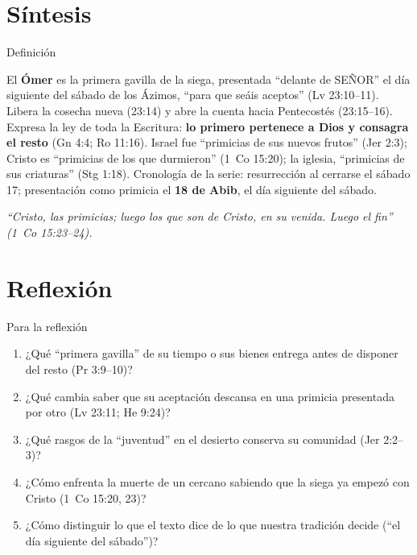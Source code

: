 \documentclass[hyperref={bookmarks=false},aspectratio=169]{beamer}
\newcommand{\SENOR}{S{\fontsize{0.78em}{1em}\selectfont EÑOR}}
\newcommand{\destacar}[1]{\textbf{\textcolor{tierraroja}{#1}}}
\begin{document}
\section{Síntesis}

\begin{frame}{Definición}
\begin{tcolorbox}[colback=papiro,colframe=tierraroja,boxrule=1pt,arc=3pt,fontupper=\small]
\RaggedRight El \destacar{Ómer} es la primera gavilla de la siega, presentada ``delante de \SENOR'' el día siguiente del sábado de los Ázimos, ``para que seáis aceptos'' (Lv 23:10--11). Libera la cosecha nueva (23:14) y abre la cuenta hacia Pentecostés (23:15--16). Expresa la ley de toda la Escritura: \destacar{lo primero pertenece a Dios y consagra el resto} (Gn 4:4; Ro 11:16). Israel fue ``primicias de sus nuevos frutos'' (Jer 2:3); Cristo es ``primicias de los que durmieron'' (1~Co 15:20); la iglesia, ``primicias de sus criaturas'' (Stg 1:18). Cronología de la serie: resurrección al cerrarse el sábado 17; presentación como primicia el \destacar{18 de Abib}, el día siguiente del sábado.
\end{tcolorbox}
\centering\small\itshape ``Cristo, las primicias; luego los que son de Cristo, en su venida. Luego el fin'' (1~Co 15:23--24).
\end{frame}


\section{Reflexión}

\begin{frame}{Para la reflexión}
\small\RaggedRight
\begin{enumerate}
\item ¿Qué ``primera gavilla'' de su tiempo o sus bienes entrega antes de disponer del resto (Pr 3:9--10)?
\item ¿Qué cambia saber que su aceptación descansa en una primicia presentada por otro (Lv 23:11; He 9:24)?
\item ¿Qué rasgos de la ``juventud'' en el desierto conserva su comunidad (Jer 2:2--3)?
\item ¿Cómo enfrenta la muerte de un cercano sabiendo que la siega ya empezó con Cristo (1~Co 15:20, 23)?
\item ¿Cómo distinguir lo que el texto dice de lo que nuestra tradición decide (``el día siguiente del sábado'')?
\end{enumerate}
\end{frame}
\end{document}
